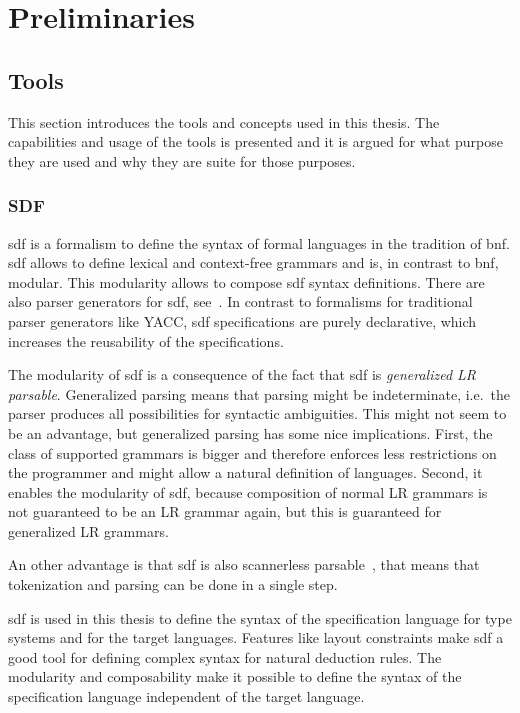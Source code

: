 
\chapter{Preliminaries}
\section{Tools}
This section introduces the tools and concepts used in this
thesis. The capabilities and usage of the tools is presented and it is
argued for what purpose they are used and why they are suite for those
purposes.
\subsection{SDF}
\gls{sdf} is a formalism to define the syntax of formal languages in
the tradition of \gls{bnf}. \gls{sdf} allows to define lexical and
context-free grammars and is, in contrast to \gls{bnf}, modular. This
modularity allows to compose \gls{sdf} syntax definitions. There are
also parser generators for \gls{sdf},
see~\cite{Rekers92parsergeneration}. In contrast to formalisms for
traditional parser generators like YACC, \gls{sdf} specifications are
purely declarative, which increases the reusability of the
specifications.

The modularity of \gls{sdf} is a consequence of the fact that
\gls{sdf} is \textit{generalized LR
  parsable}\cite{Rekers92parsergeneration}. Generalized parsing means
that parsing might be indeterminate, i.e.\ the parser produces all
possibilities for syntactic ambiguities. This might not seem to be an
advantage, but generalized parsing has some nice implications. First,
the class of supported grammars is bigger and therefore enforces less
restrictions on the programmer and might allow a natural definition of
languages. Second, it enables the modularity of \gls{sdf}, because
composition of normal LR grammars is not guaranteed to be an LR
grammar again, but this is guaranteed for generalized LR grammars.

An other advantage is that \gls{sdf} is also scannerless
parsable~\cite{Brand02disambiguationfilters}, that means that
tokenization and parsing can be done in a single step.


\gls{sdf} is used in this thesis to define the syntax of the
specification language for type systems and for the target
languages. Features like layout constraints make \gls{sdf} a good tool
for defining complex syntax for natural deduction rules. The
modularity and composability make it possible to define the syntax of
the specification language independent of the target language.

